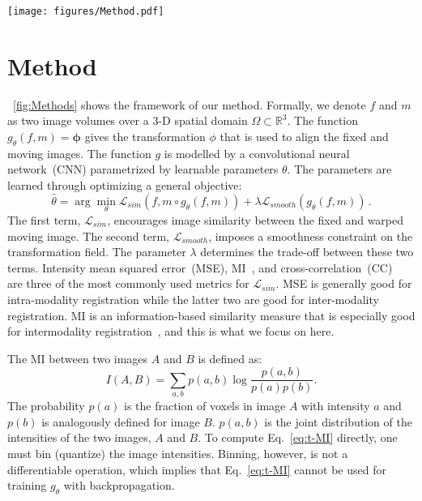 \documentclass[]{spie}  %
\begin{document}
\begin{figure*}[!tb]
	\centering
		\texttt{[image: figures/Method.pdf]}
		\caption
		{ The framework of our method. Given a fixed image, which is distortion-free, and a B0 image from the diffusion MRI, which suffers from geometric distortion, the Unet-like network predicts the deformation that corrects the distortion. 
		}  %
		\label{fig:Methods}
\end{figure*}



\section{Method}
%
\figurename~\ref{fig:Methods} shows the framework of our method. Formally, we denote $f$ and $m$ as two image volumes over a 3-D spatial domain $\Omega \subset \mathbb{R}^{3}$. The function $g_{\theta}(f,m) = \mathbf{\phi}$ gives the transformation $\phi$ that is used to align the fixed and moving images. The function $g$ is modelled by a convolutional neural network~(CNN) parametrized by learnable parameters $\theta$. The parameters are learned through optimizing a general objective: 
\begin{equation}
	\hat{\theta} =  \arg \min_{\theta} \mathcal{L}_{sim}(f, m \circ g_{\theta}(f,m)) + \lambda \mathcal{L}_{smooth}(g_{\theta}(f,m))\,.
\end{equation}
%
The first term, $\mathcal{L}_{sim}$, encourages image similarity between the fixed and warped moving image. The second term, $\mathcal{L}_{smooth}$, imposes a smoothness constraint on the transformation field. The parameter $\lambda$ determines the trade-off between these two terms. 
Intensity mean squared error~(MSE), MI~\cite{viola1997alignmentShort}, and cross-correlation~(CC)~\cite{avants2008symmetricShort} are three of the most commonly used metrics for $\mathcal{L}_{sim}$. MSE is generally good for intra-modality registration while the latter two are good for inter-modality registration. MI is an information-based similarity measure that is especially good for intermodality registration~\cite{avants2011reproducibleShort}, and this is what we focus on here. 

The MI between two images $A$ and $B$ is defined as:
\begin{equation}
	I(A, B)=\sum_{a, b} p(a, b) \log \frac{p(a, b)}{p(a) p(b)}.
	\label{eq:t-MI}
\end{equation}
The probability $p(a)$ is the fraction of voxels in image $A$ with intensity $a$ and $p(b)$ is analogously defined for image $B$.  $p(a, b)$ is the joint distribution of the intensities of the two images, $A$ and $B$. To compute Eq.~\eqref{eq:t-MI} directly, one must bin (quantize) the image intensities. Binning, however, is not a differentiable operation, which implies that Eq.~\eqref{eq:t-MI} cannot be used for training $g_\theta$ with backpropagation. 
\end{document}
